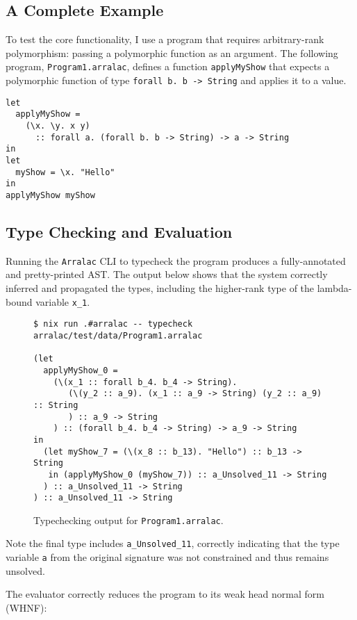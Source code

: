 \subsection{A Complete Example}
To test the core functionality, I use a program that requires arbitrary-rank polymorphism: passing a polymorphic function as an argument. The following program, \texttt{Program1.arralac}, defines a function \texttt{applyMyShow} that expects a polymorphic function of type \texttt{forall b. b -> String} and applies it to a value.

\begin{verbatim}
let
  applyMyShow =
    (\x. \y. x y)
      :: forall a. (forall b. b -> String) -> a -> String
in
let
  myShow = \x. "Hello"
in
applyMyShow myShow
\end{verbatim}

\subsection{Type Checking and Evaluation}
Running the \texttt{Arralac} CLI to typecheck the program produces a fully-annotated and pretty-printed AST. The output below shows that the system correctly inferred and propagated the types, including the higher-rank type of the lambda-bound variable \texttt{x\_1}.

\begin{figure}[h]
  \centering
  \begin{verbatim}
$ nix run .#arralac -- typecheck arralac/test/data/Program1.arralac

(let
  applyMyShow_0 = 
    (\(x_1 :: forall b_4. b_4 -> String).
       (\(y_2 :: a_9). (x_1 :: a_9 -> String) (y_2 :: a_9) :: String
       ) :: a_9 -> String
    ) :: (forall b_4. b_4 -> String) -> a_9 -> String
in
  (let myShow_7 = (\(x_8 :: b_13). "Hello") :: b_13 -> String
   in (applyMyShow_0 (myShow_7)) :: a_Unsolved_11 -> String
  ) :: a_Unsolved_11 -> String
) :: a_Unsolved_11 -> String
\end{verbatim}
  \caption{Typechecking output for \texttt{Program1.arralac}.}
  \label{fig:typecheck-output}
\end{figure}

Note the final type includes \texttt{a\_Unsolved\_11}, correctly indicating that the type variable \texttt{a} from the original signature was not constrained and thus remains unsolved.

The evaluator correctly reduces the program to its weak head normal form (WHNF):

